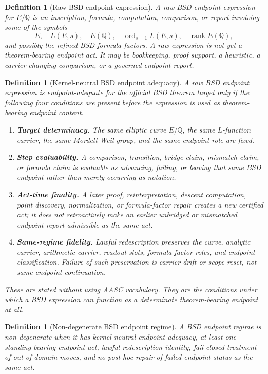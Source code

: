 \documentclass[11pt]{article}
\newtheorem{definition}[theorem]{Definition}
\newcommand{\Q}{\mathbb{Q}}
\newcommand{\rank}{\operatorname{rank}}
\newcommand{\ord}{\operatorname{ord}}
\begin{document}
\begin{definition}[Raw BSD endpoint expression]
A raw BSD endpoint expression for $E/\Q$ is an inscription, formula, computation, comparison, or report involving some of the symbols
\[
E,\quad L(E,s),\quad E(\Q),\quad \ord_{s=1}L(E,s),\quad \rank E(\Q),
\]
and possibly the refined BSD formula factors. A raw expression is not yet a theorem-bearing endpoint act. It may be bookkeeping, proof support, a heuristic, a carrier-changing comparison, or a governed endpoint report.
\end{definition}

\begin{definition}[Kernel-neutral BSD endpoint adequacy]\label{def:kernel-neutral-adequacy}
A raw BSD endpoint expression is endpoint-adequate for the official BSD theorem target only if the following four conditions are present before the expression is used as theorem-bearing endpoint content.
\begin{enumerate}[label=(A\arabic*)]
\item \textbf{Target determinacy.} The same elliptic curve $E/\Q$, the same $L$-function carrier, the same Mordell-Weil group, and the same endpoint role are fixed.
\item \textbf{Step evaluability.} A comparison, transition, bridge claim, mismatch claim, or formula claim is evaluable as advancing, failing, or leaving that same BSD endpoint rather than merely occurring as notation.
\item \textbf{Act-time finality.} A later proof, reinterpretation, descent computation, point discovery, normalization, or formula-factor repair creates a new certified act; it does not retroactively make an earlier unbridged or mismatched endpoint report admissible as the same act.
\item \textbf{Same-regime fidelity.} Lawful redescription preserves the curve, analytic carrier, arithmetic carrier, readout slots, formula-factor roles, and endpoint classification. Failure of such preservation is carrier drift or scope reset, not same-endpoint continuation.
\end{enumerate}
These are stated without using AASC vocabulary. They are the conditions under which a BSD expression can function as a determinate theorem-bearing endpoint at all.
\end{definition}

\begin{definition}[Non-degenerate BSD endpoint regime]\label{def:nondeg-bsd-regime}
A BSD endpoint regime is non-degenerate when it has kernel-neutral endpoint adequacy, at least one standing-bearing endpoint act, lawful redescription identity, fail-closed treatment of out-of-domain moves, and no post-hoc repair of failed endpoint status as the same act.
\end{definition}
\end{document}
